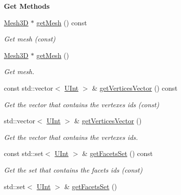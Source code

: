 \begin{Indent}{\bf Get Methods}\par
\begin{DoxyCompactItemize}
\item 
\hyperlink{classFVCode3D_1_1Mesh3D}{Mesh3D} $\ast$ \hyperlink{classFVCode3D_1_1Mesh3D_1_1Cell3D_a0b189bebb77030c320b3d51b873de936}{get\+Mesh} () const 
\begin{DoxyCompactList}\small\item\em Get mesh (const) \end{DoxyCompactList}\item 
\hyperlink{classFVCode3D_1_1Mesh3D}{Mesh3D} $\ast$ \hyperlink{classFVCode3D_1_1Mesh3D_1_1Cell3D_a1ed205c07fc6c97f87ce545eb765ed07}{get\+Mesh} ()
\begin{DoxyCompactList}\small\item\em Get mesh. \end{DoxyCompactList}\item 
const std\+::vector$<$ \hyperlink{namespaceFVCode3D_a4bf7e328c75d0fd504050d040ebe9eda}{U\+Int} $>$ \& \hyperlink{classFVCode3D_1_1Mesh3D_1_1Cell3D_add685e1431913c75e0d6186b7290a60e}{get\+Vertices\+Vector} () const 
\begin{DoxyCompactList}\small\item\em Get the vector that contains the vertexes ids (const) \end{DoxyCompactList}\item 
std\+::vector$<$ \hyperlink{namespaceFVCode3D_a4bf7e328c75d0fd504050d040ebe9eda}{U\+Int} $>$ \& \hyperlink{classFVCode3D_1_1Mesh3D_1_1Cell3D_a1c8a8b414647e82d4b0e81e188cb5ffc}{get\+Vertices\+Vector} ()
\begin{DoxyCompactList}\small\item\em Get the vector that contains the vertexes ids. \end{DoxyCompactList}\item 
const std\+::set$<$ \hyperlink{namespaceFVCode3D_a4bf7e328c75d0fd504050d040ebe9eda}{U\+Int} $>$ \& \hyperlink{classFVCode3D_1_1Mesh3D_1_1Cell3D_ab39f9e4bf268566da035b41ce6a409be}{get\+Facets\+Set} () const 
\begin{DoxyCompactList}\small\item\em Get the set that contains the facets ids (const) \end{DoxyCompactList}\item 
std\+::set$<$ \hyperlink{namespaceFVCode3D_a4bf7e328c75d0fd504050d040ebe9eda}{U\+Int} $>$ \& \hyperlink{classFVCode3D_1_1Mesh3D_1_1Cell3D_a498b56f6c2cd5fb6250f2b9b40d224a7}{get\+Facets\+Set} ()

\end{DoxyCompactItemize}
\end{Indent}
